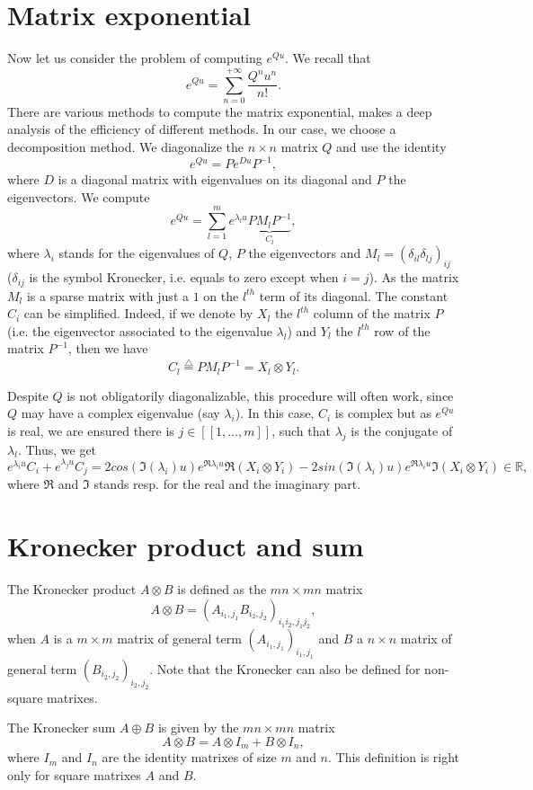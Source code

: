 \section{Matrix exponential}\label{computexpm}
Now let us consider the problem of computing $e^{Qu}$. We recall that 
$$
e^{Qu} =\sum_{n=0}^{+\infty} \frac{Q^nu^n}{n!}.
$$
There are various methods to compute the matrix exponential, \cite{molervanloan} makes a deep analysis
of the efficiency of different methods. In our case, we choose a decomposition method. We diagonalize the $n\times n$ matrix $Q$
and use the identity
$$
e^{Qu} = Pe^{Du}P^{-1},
$$
where $D$ is a diagonal matrix with eigenvalues on its diagonal and $P$ the eigenvectors. We compute 
$$
e^{Qu} = \sum_{l=1}^{m} e^{\lambda_l u} \underbrace{ P M_l P^{-1} }_{C_l},
$$
where $\lambda_i$ stands for the eigenvalues of $Q$, $P$ the eigenvectors and $M_l=(\delta_{il} \delta_{lj})_{ij}$
 ($\delta_{ij}$ is the symbol Kronecker, i.e. equals to zero except when $i=j$). As the matrix $M_l$ is a sparse 
 matrix with just a $1$ on the $l^{th}$ term of its diagonal. The constant $C_i$ can be simplified. Indeed,
 if we denote by $X_l$ the $l^{th}$ column of the matrix $P$ (i.e. the eigenvector associated to the eigenvalue
 $\lambda_l$) and $Y_l$ the $l^{th}$ row of the matrix $P^{-1}$, then we have 
 $$
  C_l\stackrel{\triangle}{=} P M_l P^{-1}  =  X_l\otimes Y_l.
  $$
  
  Despite $Q$ is not obligatorily diagonalizable, this procedure will often work, since $Q$ may have a complex eigenvalue (say $\lambda_i$).
In this case, $C_i$ is complex but as $e^{Qu}$ is real, we are ensured there is $j\in [\![1,\dots,m ]\!]$, such that 
$\lambda_j$ is the conjugate of $\lambda_l$. Thus, we get 
$$
e^{\lambda_i u}C_i+e^{\lambda_j u}C_j = 2 cos(\Im(\lambda_i)u) e^{\Re{\lambda_i}u}  \Re(X_i\otimes Y_i)
-2sin(\Im(\lambda_i)u) e^{\Re{\lambda_i}u}  \Im(X_i\otimes Y_i) \in \mathbb R,
$$
where $\Re$ and $\Im$ stands resp. for the real and the imaginary part.

\section{Kronecker product and sum\label{kronecker}}
The Kronecker product $A\otimes B$ is defined as the $mn\times mn$ matrix 
$$
A\otimes B = (A_{i_1,j_1} B_{i_2,j_2})_{i_1i_2,j_1j_2},
$$
when $A$ is a $m\times m$ matrix of general term $(A_{i_1,j_1})_{i_1,j_1}$ and $B$ 
a $n\times n$ matrix of general term $(B_{i_2,j_2})_{i_2,j_2}$. Note that the Kronecker can
also be defined for non-square matrixes.

The Kronecker sum $A\oplus B$ is given by the $mn\times mn$ matrix 
$$
A\otimes B =  A\otimes I_m + B\otimes I_n,
$$
where $I_m$ and $I_n$ are the identity matrixes of size $m$ and $n$. This definition is right only
for square matrixes $A$ and $B$.

